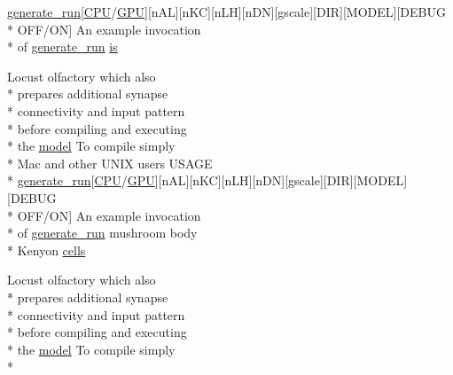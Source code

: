 \begin{DoxyCompactItemize}
\hyperlink{userproject_2MBody__userdef__project_2README_8txt_a320a215d1e27b4de394be70e90d22863}{generate\+\_\+run}\mbox{[}\hyperlink{README_8txt_a74a069e3c75797de2636c4dd14daa147}{C\+P\+U}/\hyperlink{modelSpec_8h_a39cb9803524b6f3b783344b2f89867b4}{G\+P\+U}\mbox{]}\mbox{[}n\+A\+L\mbox{]}\mbox{[}n\+K\+C\mbox{]}\mbox{[}n\+L\+H\mbox{]}\mbox{[}n\+D\+N\mbox{]}\mbox{[}gscale\mbox{]}\mbox{[}D\+I\+R\mbox{]}\mbox{[}M\+O\+D\+E\+L\mbox{]}\mbox{[}D\+E\+B\+U\+G \\*
O\+F\+F/O\+N\mbox{]} An example invocation \\*
of \hyperlink{userproject_2MBody__userdef__project_2README_8txt_a320a215d1e27b4de394be70e90d22863}{generate\+\_\+run} \hyperlink{userproject_2MBody1__project_2README_8txt_aac3f20bc10af7f579c0fa075cf788fcc}{is}
\item 
Locust olfactory which also \\*
prepares additional synapse \\*
connectivity and input pattern \\*
before compiling and executing \\*
the \hyperlink{README_8txt_a69fd801b7213948c12d9dd7eebb3ed14}{model} To compile simply \\*
Mac and other U\+N\+I\+X users U\+S\+A\+G\+E \\*
\hyperlink{userproject_2MBody__userdef__project_2README_8txt_a320a215d1e27b4de394be70e90d22863}{generate\+\_\+run}\mbox{[}\hyperlink{README_8txt_a74a069e3c75797de2636c4dd14daa147}{C\+P\+U}/\hyperlink{modelSpec_8h_a39cb9803524b6f3b783344b2f89867b4}{G\+P\+U}\mbox{]}\mbox{[}n\+A\+L\mbox{]}\mbox{[}n\+K\+C\mbox{]}\mbox{[}n\+L\+H\mbox{]}\mbox{[}n\+D\+N\mbox{]}\mbox{[}gscale\mbox{]}\mbox{[}D\+I\+R\mbox{]}\mbox{[}M\+O\+D\+E\+L\mbox{]}\mbox{[}D\+E\+B\+U\+G \\*
O\+F\+F/O\+N\mbox{]} An example invocation \\*
of \hyperlink{userproject_2MBody__userdef__project_2README_8txt_a320a215d1e27b4de394be70e90d22863}{generate\+\_\+run} mushroom body \\*
Kenyon \hyperlink{userproject_2MBody1__project_2README_8txt_a2fae4890b44aedf0e413816d91282f01}{cells}
\item 
Locust olfactory which also \\*
prepares additional synapse \\*
connectivity and input pattern \\*
before compiling and executing \\*
the \hyperlink{README_8txt_a69fd801b7213948c12d9dd7eebb3ed14}{model} To compile simply \\*

\end{DoxyCompactItemize}
